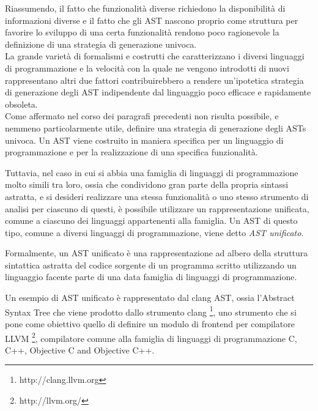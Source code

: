 Riassumendo, il fatto che funzionalità diverse richiedono la disponibilità di
informazioni diverse e il fatto che gli AST nascono proprio come struttura per
favorire lo sviluppo di una certa funzionalità rendono poco ragionevole la
definizione di una strategia di generazione univoca.\\

La grande varietà di formalismi e costrutti che caratterizzano i diversi
linguaggi di programmazione e la velocità con la quale ne vengono introdotti di
nuovi rappresentano altri due fattori contribuirebbero a rendere un'ipotetica
strategia di generazione degli AST indipendente dal linguaggio poco efficace e
rapidamente obsoleta.\\

Come affermato nel corso dei paragrafi precedenti non risulta possibile, e
nemmeno particolarmente utile, definire una strategia di generazione degli ASTs
univoca. Un AST viene costruito in maniera specifica per un linguaggio di
programmazione e per la realizzazione di una specifica funzionalità.

Tuttavia, nel caso in cui si abbia una famiglia di linguaggi di programmazione
molto simili tra loro, ossia che condividono gran parte della propria sintassi
astratta, e si desideri realizzare una stessa funzionalità o uno stesso
strumento di analisi per ciascuno di questi, è possibile utilizzare un
rappresentazione unificata, comune a ciascuno dei linguaggi appartenenti alla
famiglia. Un AST di questo tipo, comune a diversi linguaggi di programmazione,
viene detto \textit{AST unificato}.

Formalmente, un AST unificato è una rappresentazione ad albero della struttura
sintattica astratta del codice sorgente di un programma scritto utilizzando un
linguaggio facente parte di una data famiglia di linguaggi di programmazione.

Un esempio di AST unificato è rappresentato dal clang AST, ossia l’Abstract
Syntax Tree che viene prodotto dallo strumento clang \footnote
{http://clang.llvm.org}, uno strumento che si pone come obiettivo quello di
definire un modulo di frontend per compilatore LLVM \footnote{http://llvm.org/},
compilatore comune alla famiglia di linguaggi di programmazione C, C++,
Objective C and Objective C++. \cite{DBLP:conf/lcpc/LattnerA04}\\

